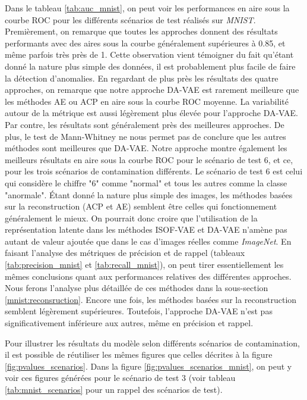 Dans le tableau \ref{tab:auc_mnist}, on peut voir les performances en aire sous la courbe ROC pour les différents scénarios de test réalisés sur \textit{MNIST}. Premièrement, on remarque que toutes les approches donnent des résultats performants avec des aires sous la courbe généralement supérieures à 0.85, et même parfois très près de 1. Cette observation vient témoigner du fait qu'étant donné la nature plus simple des données, il est probablement plus facile de faire la détection d'anomalies. En regardant de plus près les résultats des quatre approches, on remarque que notre approche DA-VAE est rarement meilleure que les méthodes AE ou ACP en aire sous la courbe ROC moyenne. La variabilité autour de la métrique est aussi légèrement plus élevée pour l'approche DA-VAE. Par contre, les résultats sont généralement près des meilleures approches. De plus, le test de Mann-Whitney ne nous permet pas de conclure que les autres méthodes sont meilleures que DA-VAE. Notre approche montre également les meilleurs résultats en aire sous la courbe ROC pour le scénario de test 6, et ce, pour les trois scénarios de contamination différents. Le scénario de test 6 est celui qui considère le chiffre "6" comme "normal" et tous les autres comme la classe "anormale". Étant donné la nature plus simple des images, les méthodes basées sur la reconstruction (ACP et AE) semblent être celles qui fonctionnement généralement le mieux. On pourrait donc croire que l'utilisation de la représentation latente dans les méthodes ISOF-VAE et DA-VAE n'amène pas autant de valeur ajoutée que dans le cas d'images réelles comme \textit{ImageNet}. En faisant l'analyse des métriques de précision et de rappel (tableaux \ref{tab:precision_mnist} et \ref{tab:recall_mnist}), on peut tirer essentiellement les mêmes conclusions quant aux performances relatives des différentes approches. Nous ferons l'analyse plus détaillée de ces méthodes dans la sous-section \ref {mnist:reconsruction}. Encore une fois, les méthodes basées sur la reconstruction semblent légèrement supérieures. Toutefois, l'approche DA-VAE n'est pas significativement inférieure aux autres, même en précision et rappel.

Pour illustrer les résultats du modèle selon différents scénarios de contamination, il est possible de réutiliser les mêmes figures que celles décrites à la figure \ref{fig:pvalues_scenarios}. Dans la figure \ref{fig:pvalues_scenarios_mnist}, on peut y voir ces figures générées pour le scénario de test 3 (voir tableau \ref{tab:mnist_scenarios} pour un rappel des scénarios de test).

